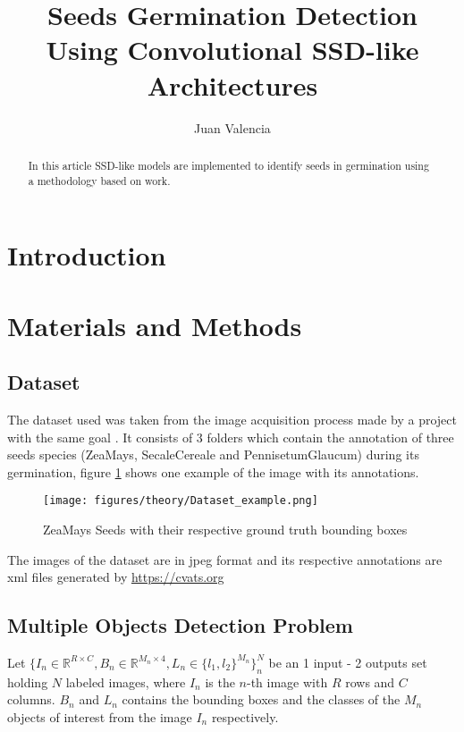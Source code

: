 \documentclass{IEEEtran}
\title{Seeds Germination Detection Using Convolutional SSD-like Architectures}
\author{Juan Valencia}
\begin{document}
\maketitle

\begin{abstract}
    In this article SSD-like models are implemented to identify seeds in
    germination using a methodology based on \cite{main:seedproject} work.
\end{abstract}


\section{Introduction}

\section{Materials and Methods}

\subsection{Dataset}
The dataset used was taken from the image acquisition process made by a project
with the same goal \cite{main:seedproject}. It consists of 3 folders which
contain the annotation of three seeds species (ZeaMays, SecaleCereale and
PennisetumGlaucum) during its germination, figure \ref{fig:zeamays_demo} shows
one example of the image with its annotations.
\begin{figure}[ht]
    \centering
    \texttt{[image: figures/theory/Dataset\_example.png]}
    \caption{ZeaMays Seeds with their respective ground truth bounding boxes}
    \label{fig:zeamays_demo}
\end{figure}
The images of the dataset are in jpeg format and its respective annotations are
xml files generated by \url{https://cvats.org}


\subsection{Multiple Objects Detection Problem}
Let $\{ I_n \in \mathbb{R}^{R \times C}, B_n \in \mathbb{R}^{M_n \times 4}, L_n
\in \{l_1, l_2\}^{M_n}\}^N_n$ be an 1 input - 2 outputs set holding $N$
labeled images, where $I_n$ is the $n$-th image with $R$ rows and $C$ columns.
$B_n$ and $L_n$ contains the bounding boxes and the classes of the $M_n$ objects
of interest from the image $I_n$ respectively.\par
\end{document}
